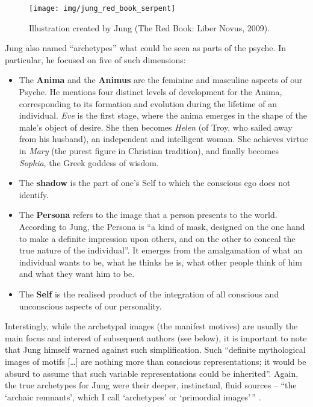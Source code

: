 \documentclass[]{book}
\providecommand{\tightlist}{%
  \setlength{\itemsep}{0pt}\setlength{\parskip}{0pt}}
\begin{document}
\begin{figure}

{\centering \texttt{[image: img/jung\_red\_book\_serpent]} 

}

\caption{Illustration created by Jung (The Red Book: Liber Novus, 2009).}\label{fig:unnamed-chunk-4}
\end{figure}

Jung also named ``archetypes'' what could be seen as parts of the psyche. In particular, he focused on five of such dimensions:

\begin{itemize}
\tightlist
\item
  The \textbf{Anima} and the \textbf{Animus} are the feminine and masculine aspects of our Psyche. He mentions four distinct levels of development for the Anima, corresponding to its formation and evolution during the lifetime of an individual. \emph{Eve} is the first stage, where the anima emerges in the shape of the male's object of desire. She then becomes \emph{Helen} (of Troy, who sailed away from his husband), an independent and intelligent woman. She achieves virtue in \emph{Mary} (the purest figure in Christian tradition), and finally becomes \emph{Sophia}, the Greek goddess of wisdom.
\item
  The \textbf{shadow} is the part of one's Self to which the conscious ego does not identify.
\item
  The \textbf{Persona} refers to the image that a person presents to the world. According to Jung, the Persona is ``a kind of mask, designed on the one hand to make a definite impression upon others, and on the other to conceal the true nature of the individual''. It emerges from the amalgamation of what an individual wants to be, what he thinks he is, what other people think of him and what they want him to be.
\item
  The \textbf{Self} is the realised product of the integration of all conscious and unconscious aspects of our personality.
\end{itemize}

Interstingly, while the archetypal images (the manifest motives) are usually the main focus and interest of subsequent authors (see below), it is important to note that Jung himself warned against such simplification. Such ``definite mythological images of motifs {[}\ldots{]} are nothing more than conscious representations; it would be absurd to assume that such variable representations could be inherited''. Again, the true archetypes for Jung were their deeper, instinctual, fluid sources -- ``the `archaic remnants', which I call `archetypes' or `primordial images'\,'' \citep{jung1964approaching}.
\end{document}
